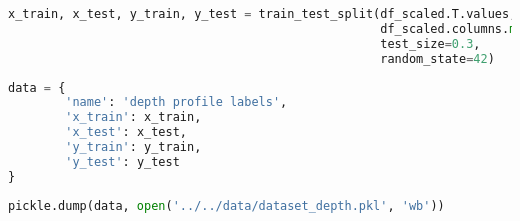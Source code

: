 \begin{lstlisting}[language=Python]
x_train, x_test, y_train, y_test = train_test_split(df_scaled.T.values,
                                                    df_scaled.columns.map(lambda x: transform_depth_label(x)), # first part of the filename is the top label
                                                    test_size=0.3,
                                                    random_state=42)
\end{lstlisting}

\begin{lstlisting}[language=Python]
data = {
        'name': 'depth profile labels',
        'x_train': x_train,
        'x_test': x_test,
        'y_train': y_train,
        'y_test': y_test
}
\end{lstlisting}

\begin{lstlisting}[language=Python]
pickle.dump(data, open('../../data/dataset_depth.pkl', 'wb'))
\end{lstlisting}
